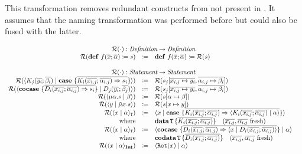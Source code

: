 This transformation removes redundant constructs from \targetlang{} not present in \machinelang.
It assumes that the naming transformation was performed before but could also be fused with the latter.

\[
  \begin{array}{rcll}
    \multicolumn{4}{c}{\redundancy{\cdot} : \emph{Definition} \rightarrow \emph{Definition}}\\
    \redundancy{\defi{f(\overline{x}; \overline{\alpha})}{s}} & \coloneq & \defi{f(\overline{x}; \overline{\alpha})}{\redundancy{s}} & \\
    \\
    \multicolumn{4}{c}{\redundancy{\cdot} : \emph{Statement} \rightarrow \emph{Statement}}\\
    \redundancy{\cut{K_j(\overline{y_i}; \overline{\beta_i})}{\case{\overline{K_i(\overline{x_{i,j}}; \overline{\alpha_{i,j}}) \Rightarrow s_i}}}} & \coloneq & \redundancy{s_j[\overline{x_{i,j} \mapsto y_i}, \overline{\alpha_{i,j} \mapsto \beta_i}]} & \\
    \redundancy{\cut{\cocase{\overline{D_i(\overline{x_{i,j}}; \overline{\alpha_{i,j}}) \Rightarrow s_i}}}{D_j(\overline{y_i}; \overline{\beta_j})}} & \coloneq & \redundancy{s_j[\overline{x_{i,j} \mapsto y_i}, \overline{\alpha_{i,j} \mapsto \beta_i}]} & \\
    \redundancy{\cut{\mu\alpha.s}{\beta}} & \coloneq & \redundancy{s[\alpha \mapsto \beta]} & \\
    \redundancy{\cut{y}{\tilde{\mu}x.s}} & \coloneq & \redundancy{s[x \mapsto y]} & \\
    \redundancy{\cut{x}{\alpha}_\mathtt{T}} & \coloneq & \cut{x}{\case{\overline{K_i(\overline{x_{i,j}}; \overline{\alpha_{i,j}}) \Rightarrow \cut{K_i(\overline{x_{i,j}}; \overline{\alpha_{i,j}})}{\alpha}}}} & \\
    \text{where} &  & \data{T}{\overline{K_i(\overline{x_{i,j}}; \overline{\alpha_{i,j}})}} \quad \fresh{\overline{x_{i,j}}, \overline{\alpha_{i,j}}} & \\
    \redundancy{\cut{x}{\alpha}_\mathtt{T}} & \coloneq & \cut{\cocase{\overline{D_i(\overline{x_{i,j}}; \overline{\alpha_{i,j}}) \Rightarrow \cut{x}{D_i(\overline{x_{i,j}}; \overline{\alpha_{i,j}})}}}}{\alpha} & \\
    \text{where} &  & \codata{T}{\overline{D_i(\overline{x_{i,j}}; \overline{\alpha_{i,j}})}} \quad \fresh{\overline{x_{i,j}}, \overline{\alpha_{i,j}}} & \\
    \redundancy{\cut{x}{\alpha}_\tyint} & \coloneq & \cut{\mathtt{Ret}(x)}{\alpha} & \\

\end{array}\]
